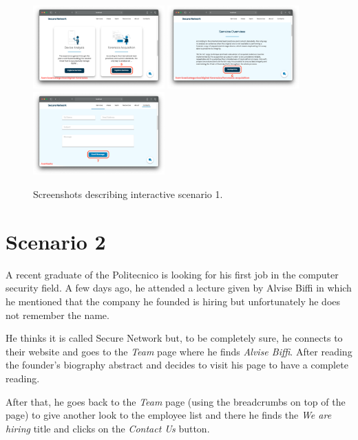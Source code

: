 \documentclass[12pt]{report}
\begin{document}
\begin{figure}[H]
	\centering
	\includegraphics[width=0.45\textwidth]{scenarios/1/5.png}
	\includegraphics[width=0.45\textwidth]{scenarios/1/6.png}
	\includegraphics[width=0.45\textwidth]{scenarios/1/7.png}
	\caption{Screenshots describing interactive scenario 1.}
\end{figure}

\clearpage
\section{Scenario 2}
A recent graduate of the Politecnico is looking for his first job in the computer security field.
A few days ago, he attended a lecture given by Alvise Biffi in which he mentioned that the company he founded is hiring but unfortunately he does not remember the name.

He thinks it is called Secure Network but, to be completely sure, he connects to their website and goes to the \emph{Team} page where he finds \emph{Alvise Biffi}.
After reading the founder's biography abstract and decides to visit his page to have a complete reading. 

After that, he goes back to the \emph{Team} page (using the breadcrumbs on top of the page) to give another look to the employee list and there he finds the \emph{We are hiring} title and clicks on the \emph{Contact Us} button.
\end{document}
